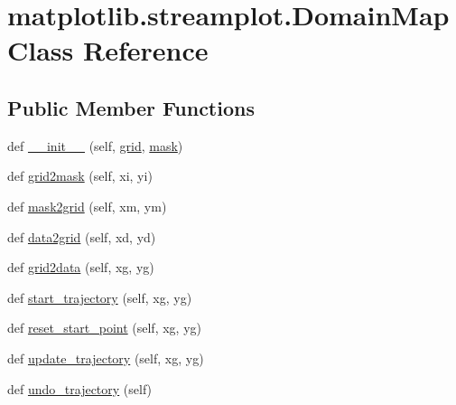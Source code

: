 \hypertarget{classmatplotlib_1_1streamplot_1_1DomainMap}{}\section{matplotlib.\+streamplot.\+Domain\+Map Class Reference}
\label{classmatplotlib_1_1streamplot_1_1DomainMap}
\subsection*{Public Member Functions}
\begin{DoxyCompactItemize}
\item 
def \hyperlink{classmatplotlib_1_1streamplot_1_1DomainMap_a7926baa65be58918d596fc5a3679b5a4}{\+\_\+\+\_\+init\+\_\+\+\_\+} (self, \hyperlink{classmatplotlib_1_1streamplot_1_1DomainMap_a50a523f858cbd2ebb6227242d5d788a7}{grid}, \hyperlink{classmatplotlib_1_1streamplot_1_1DomainMap_ada03814a04e3b9e77d2adc6768d16801}{mask})
\item 
def \hyperlink{classmatplotlib_1_1streamplot_1_1DomainMap_a51f106dfc75535497a37f756f1431017}{grid2mask} (self, xi, yi)
\item 
def \hyperlink{classmatplotlib_1_1streamplot_1_1DomainMap_a69bf476af9c6d209c28c4b965f6ce38c}{mask2grid} (self, xm, ym)
\item 
def \hyperlink{classmatplotlib_1_1streamplot_1_1DomainMap_a3bb22d52a6e9eddbd8f259f7d08e508a}{data2grid} (self, xd, yd)
\item 
def \hyperlink{classmatplotlib_1_1streamplot_1_1DomainMap_a747aa575586229e784ac60d5b5b4c959}{grid2data} (self, xg, yg)
\item 
def \hyperlink{classmatplotlib_1_1streamplot_1_1DomainMap_a54c757d4ce71adbd855ae8521600c0c3}{start\+\_\+trajectory} (self, xg, yg)
\item 
def \hyperlink{classmatplotlib_1_1streamplot_1_1DomainMap_a0ff362dd422a03736981268fd01e8a80}{reset\+\_\+start\+\_\+point} (self, xg, yg)
\item 
def \hyperlink{classmatplotlib_1_1streamplot_1_1DomainMap_a8a1577f009298ec9d9af3bcf4bac12ca}{update\+\_\+trajectory} (self, xg, yg)
\item 
def \hyperlink{classmatplotlib_1_1streamplot_1_1DomainMap_ae384591faa4ee95658d578462b9c7020}{undo\+\_\+trajectory} (self)
\end{DoxyCompactItemize}
